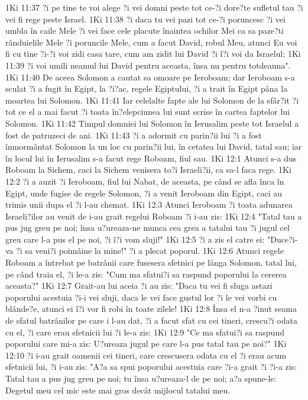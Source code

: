 1Ki 11:37  ?i pe tine te voi alege ?i vei domni peste tot ce-?i dore?te sufletul tau ?i vei fi rege peste Israel.
1Ki 11:38  ?i daca tu vei pazi tot ce-?i poruncesc ?i vei umbla în caile Mele ?i vei face cele placute înaintea ochilor Mei ca sa paze?ti rânduielile Mele ?i poruncile Mele, cum a facut David, robul Meu, atunci Eu voi fi cu tine ?i-?i voi zidi casa tare, cum am zidit lui David ?i î?i voi da Israelul;
1Ki 11:39  ?i voi umili neamul lui David pentru aceasta, însa nu pentru totdeauna".
1Ki 11:40  De aceea Solomon a cautat sa omoare pe Ieroboam; dar Ieroboam s-a sculat ?i a fugit în Egipt, la ?i?ac, regele Egiptului, ?i a trait în Egipt pâna la moartea lui Solomon.
1Ki 11:41  Iar celelalte fapte ale lui Solomon de la sfâr?it ?i tot ce el a mai facut ?i toata în?elepciunea lui sunt scrise în cartea faptelor lui Solomon.
1Ki 11:42  Timpul domniei lui Solomon în Ierusalim peste tot Israelul a fost de patruzeci de ani.
1Ki 11:43  ?i a adormit cu parin?ii lui ?i a fost înmormântat Solomon la un loc cu parin?ii lui, în cetatea lui David, tatal sau; iar în locul lui în Ierusalim s-a facut rege Roboam, fiul sau.
1Ki 12:1  Atunci s-a dus Roboam la Sichem, caci la Sichem venisera to?i Israeli?ii, ca sa-l faca rege.
1Ki 12:2  ?i a auzit ?i Ieroboam, fiul lui Nabat, de aceasta, pe când se afla înca în Egipt, unde fugise de regele Solomon, ?i a venit Ieroboam din Egipt, caci au trimis unii dupa el ?i l-au chemat.
1Ki 12:3  Atunci Ieroboam ?i toata adunarea Israeli?ilor au venit de i-au grait regelui Roboam ?i i-au zis:
1Ki 12:4  "Tatal tau a pus jug greu pe noi; însa u?ureaza-ne munca cea grea a tatalui tau ?i jugul cel greu care l-a pus el pe noi, ?i î?i vom sluji!"
1Ki 12:5  ?i a zis el catre ei: "Duce?i-va ?i sa veni?i poimâine la mine!" ?i a plecat poporul.
1Ki 12:6  Atunci regele Roboam a întrebat pe batrânii care fusesera sfetnici pe lânga Solomon, tatal lui, pe când traia el, ?i le-a zis: "Cum ma sfatui?i sa raspund poporului la cererea aceasta?"
1Ki 12:7  Grait-au lui aceia ?i au zis: "Daca tu vei fi sluga astazi poporului acestuia ?i-i vei sluji, daca le vei face gustul lor ?i le vei vorbi cu blânde?e, atunci ei î?i vor fi robi în toate zilele!
1Ki 12:8  Însa el n-a ?inut seama de sfatul batrânilor pe care i l-au dat, ?i a facut sfat cu cei tineri, crescu?i odata cu el, ?i care erau sfetnicii lui ?i le-a zis:
1Ki 12:9  "Ce ma sfatui?i sa raspund poporului care mi-a zis: U?ureaza jugul pe care l-a pus tatal tau pe noi?"
1Ki 12:10  ?i i-au grait oamenii cei tineri, care crescusera odata cu el ?i erau acum sfetnicii lui, ?i i-au zis: "A?a sa spui poporului acestuia care ?i-a grait ?i ?i-a zis: Tatal tau a pus jug greu pe noi; tu însa u?ureaza-l de pe noi; a?a spune-le: Degetul meu cel mic este mai gros decât mijlocul tatalui meu.

